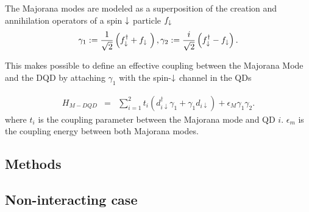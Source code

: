 \documentclass[showpacs,aps,prb,reprint,superscriptaddress]{revtex4-1}
\newcommand{\Jesus}[1]{\textcolor{red}{\fbox{Jesus} {\sl#1}}}
\begin{document}
The Majorana modes are modeled as a superposition of the creation and annihilation operators of a spin $\downarrow$ particle $f_\downarrow$
\begin{equation}
    \gamma_1 := \frac{1}{\sqrt{2}} \left( f^\dagger_{\downarrow} + f_{\downarrow}\ \right) , \gamma_2 := \frac{i}{\sqrt{2}} \left( f^\dagger_{\downarrow} - f_{\downarrow} \right). \label{eq:MajOp}
\end{equation}


This makes possible to define an effective coupling between the Majorana Mode and the DQD by attaching $\gamma_1$ with the spin-$\downarrow$ channel in the QDs

\begin{eqnarray}
H_{M-DQD} & = &  \sum_{i=1}^2t_{i} \left(d_{i\downarrow}^{\dagger}\gamma_{1}+\gamma_{1}d_{i\downarrow}\right) + \epsilon_M \gamma_1\gamma_2. 
\label{eq:H_MDQD}
\end{eqnarray}
where $t_i$ is the coupling parameter between the Majorana mode and QD $i$. $\epsilon_m$ is the coupling energy between both Majorana modes.










 
\subsection{Methods}

\subsection{Non-interacting case \label{sec:non-interactingMethods}}
\end{document}
